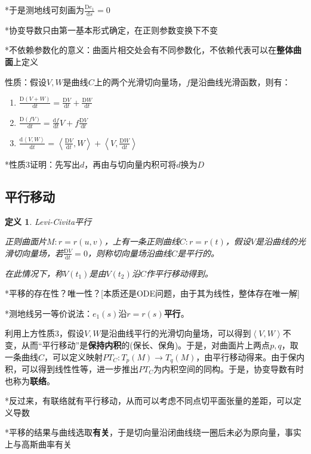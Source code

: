 \documentclass[a4paper,UTF8,fontset=windows]{ctexart}
\newtheorem{dfn}[thm]{定义}
\begin{document}
*于是测地线可刻画为$\frac{\mathrm{D}e_1}{\mathrm{d}s}=0$

*协变导数只由第一基本形式确定，在正则参数变换下不变

*不依赖参数化的意义：曲面片相交处会有不同参数化，不依赖代表可以在\textbf{整体曲面}上定义

性质：假设$V,W$是曲线$C$上的两个光滑切向量场，$f$是沿曲线光滑函数，则有：
\begin{enumerate}
    \item $\frac{\mathrm{D}(V+W)}{\mathrm{d}t}=\frac{\mathrm{D}V}{\mathrm{d}t}+\frac{\mathrm{D}W}{\mathrm{d}t}$
    \item $\frac{\mathrm{D}(fV)}{\mathrm{d}t}=\frac{\mathrm{d}f}{\mathrm{d}t}V+f\frac{\mathrm{D}V}{\mathrm{d}t}$
    \item $\frac{\mathrm{d}\left<V,W\right>}{\mathrm{d}t}=\left<\frac{\mathrm{D}V}{\mathrm{d}t},W\right>+\left<V,\frac{\mathrm{D}W}{\mathrm{d}t}\right>$
\end{enumerate}

*性质3证明：先写出$d$，再由与切向量内积可将$d$换为$D$

\subsection{平行移动}

\begin{dfn} Levi-Civita平行

正则曲面片$M:r=r(u,v)$，上有一条正则曲线$C:r=r(t)$，假设$V$是沿曲线的光滑切向量场，若$\frac{\mathrm{D}V}{\mathrm{d}t}=0$，则称切向量场沿曲线$C$是平行的。

在此情况下，称$V(t_1)$是由$V(t_2)$沿$C$作平行移动得到。
\end{dfn}

*平移的存在性？唯一性？[本质还是ODE问题，由于其为线性，整体存在唯一解]

*测地线另一等价说法：$e_1(s)$沿$r=r(s)$\textbf{平行}。

利用上方性质3，假设$V,W$是沿曲线平行的光滑切向量场，可以得到$\left<V,W\right>$不变，从而“平行移动”是\textbf{保持内积}的(保长、保角)。于是，对曲面片上两点$p,q$，取一条曲线$C$，可以定义映射$PT_C:T_p(M)\to T_q(M)$，由平行移动得来。由于保内积，可以得到线性性等，进一步推出$PT_C$为内积空间的同构。于是，协变导数有时也称为\textbf{联络}。

*反过来，有联络就有平行移动，从而可以考虑不同点切平面张量的差距，可以定义导数

*平移的结果与曲线选取\textbf{有关}，于是切向量沿闭曲线绕一圈后未必为原向量，事实上与高斯曲率有关
\end{document}
